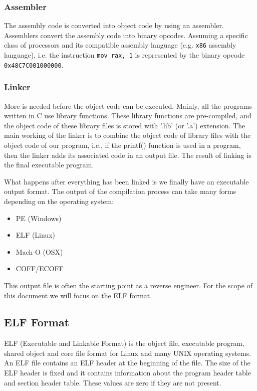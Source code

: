 \documentclass{article}
\begin{document}
\subsubsection{Assembler}

The assembly code is converted into object code by using an assembler. Assemblers convert the assembly code into
binary opcodes. Assuming a specific class of processors and its compatible assembly language (e.g. 
\texttt{x86} assembly language), i.e. the instruction \texttt{mov rax, 1} is represented by the binary opcode
\texttt{0x48C7C001000000}.

\subsubsection{Linker}

More is needed before the object code can be executed. Mainly, all the programs written in C use library functions. 
These library functions are pre-compiled, and the object code of these library files is stored with '.lib' (or '.a') 
extension. The main working of the linker is to combine the object code of library files with the object code of our 
program, i.e., if the printf() function is used in a program, then the linker adds its associated code in an output file. 
The result of linking is the final executable program.

\noindent\linebreak
What happens after everything has been linked is we finally have an executable output format. The output of the
compilation process can take many forms depending on the operating system:
\begin{itemize}
\item PE (Windows)
\item ELF (Linux)
\item Mach-O (OSX)
\item COFF/ECOFF
\end{itemize}
This output file is often the starting point as a reverse engineer. For the scope of this document we will
focus on the ELF format.

\subsection{ELF Format}

ELF (Executable and Linkable Format) is the object file, executable program, shared object and core file format 
for Linux and many UNIX operating systems. An ELF file contains an ELF header at the beginning of the file. 
The size of the ELF header is fixed and it contains information about the program header table and section header table. 
These values are zero if they are not present. \citep{elf}
\end{document}
